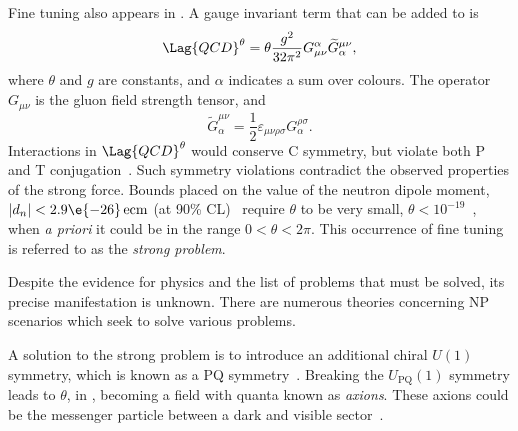 Fine tuning also appears in \QCD.
A gauge invariant term that can be added to  is
\begin{equation}
  \Lag{QCD}^\theta = \theta\frac{g^2}{32\pi^2}
  G_{\mu\nu}^\alpha\widetilde G^{\mu\nu}_\alpha,
  \label{eq:strongcp}
\end{equation}
where $\theta$ and $g$ are constants, and $\alpha$ indicates a sum over colours.
The operator $G_{\mu\nu}$ is the gluon field strength tensor, and
\begin{equation}
  \widetilde G^{\mu\nu}_\alpha = \frac12\varepsilon_{\mu\nu\rho\sigma}G^{\rho\sigma}_\alpha.
\end{equation}
Interactions in $\Lag{QCD}^\theta$ would conserve \gls{C} symmetry, but violate both \gls{P} and
\gls{T} conjugation~\cite{Peccei:2006as}.
Such symmetry violations contradict the observed properties of the strong
force.
Bounds placed on the value of the neutron dipole moment, $|d_n| <2.9\e{-26}\,\mathrm{ecm}$
(at 90\% CL)~\cite{Baker:2006ts} require $\theta$ to be very small,
$\theta<10^{-19}$~\cite{Crewther:PQref9}, when \emph{a priori} it could be in the range
$0<\theta<2\pi$.
This occurrence of fine tuning is referred to as the \emph{strong \CP problem}.

Despite the evidence for \bsm physics and the list of problems that must be solved, its precise
manifestation is unknown.
There are numerous theories concerning NP scenarios which seek to solve various problems.

A solution to the strong \CP problem is to introduce an additional chiral $U(1)$ symmetry,
which is known as a \gls{PQ} symmetry~\cite{Peccei:2006as}.
Breaking the $U_\mathrm{PQ}(1)$ symmetry leads to $\theta$, in , becoming a
field with quanta known as \emph{axions}.
These axions could be the messenger particle between a dark and visible
sector~\cite{Peccei:2006as}.





